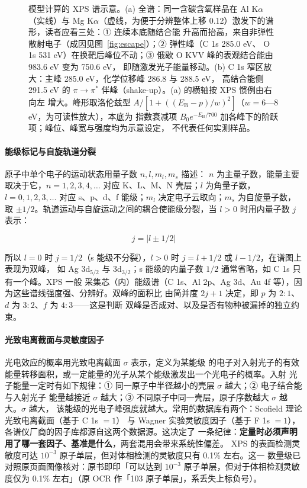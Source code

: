 \begin{figure}[tbp]
\begin{tikzpicture}
\end{tikzpicture}
\caption{模型计算的 XPS 谱示意。(a) 全谱：同一含碳含氧样品在 Al K$\alpha$（实线）与
Mg K$\alpha$（虚线，为便于分辨整体上移 0.12）激发下的谱形，读者应看三处：① 连续本底随结合能
升高而抬高，来自非弹性散射电子（成因见图~\ref{fig:escape}）；② 弹性峰（C 1s 285.0 eV、
O 1s 531 eV）在换靶后峰位不动；③ 俄歇 O KVV 峰的表观结合能由 983.6 eV 变为 750.6 eV，
即随激发光子能量移动。(b) C 1s 窄区放大：主峰 285.0 eV，化学位移峰 286.8 与 288.5 eV，
高结合能侧 291.5 eV 的 $\pi\rightarrow\pi^{*}$ 伴峰（shake-up）。(a) 的横轴按 XPS 惯例由右向左
增大。峰形取洛伦兹型 $A/[1+((E_{\mathrm{B}}-p)/w)^2]$（$w=6$—8 eV，为可读性放大），本底为
指数衰减项 $B_{0}e^{-E_{\mathrm{B}}/700}$ 加各峰下的阶跃项；峰位、峰宽与强度均为示意设定，
不代表任何实测样品。\modelmark}
\label{fig:xpsspec}
\end{figure}

\paragraph{能级标记与自旋轨道分裂}原子中单个电子的运动状态用量子数 $n,l,m_{l},m_{s}$ 描述：
$n$ 为主量子数，能量主要取决于它，$n=1,2,3,4,\dots$ 对应 K、L、M、N 壳层；$l$ 为角量子数，
$l=0,1,2,3,\dots$ 对应 s、p、d、f 能级；$m_{l}$ 决定电子云取向；$m_{s}$ 为自旋量子数，取
$\pm1/2$。轨道运动与自旋运动之间的耦合使能级分裂，当 $l>0$ 时用内量子数 $j$ 表示：

\begin{equation}\label{eq:jsplit}
j=|l\pm1/2|
\end{equation}

所以 $l=0$ 时 $j=1/2$（s 能级不分裂），$l>0$ 时 $j=l+1/2$ 或 $l-1/2$，在谱图上表现为双峰，
如 Ag 3d$_{5/2}$ 与 3d$_{3/2}$；s 能级的内量子数 $1/2$ 通常省略，如 C 1s 只有一个峰。XPS 一般
采集芯（内）能级谱（C 1s、Al 2p、Ag 3d、Au 4f 等），因为这些谱线强度强、分辨好。双峰的面积比
由简并度 $2j+1$ 决定，即 $p$ 为 $2\!:\!1$、$d$ 为 $3\!:\!2$、$f$ 为 $4\!:\!3$——这是判断
双峰是否成对、以及是否有物种被漏掉的独立约束。

\paragraph{光致电离截面与灵敏度因子}光电效应的概率用光致电离截面 $\sigma$ 表示，定义为某能级
的电子对入射光子的有效能量转移面积，或一定能量的光子从某个能级激发出一个光电子的概率。入射
光子能量一定时有如下规律：① 同一原子中半径越小的壳层 $\sigma$ 越大；② 电子结合能与入射光子
能量越接近 $\sigma$ 越大；③ 不同原子中同一壳层，原子序数越大 $\sigma$ 越大。$\sigma$ 越大，
该能级的光电子峰强度就越大。常用的数据库有两个：Scofield 理论光致电离截面（基于 C 1s $=1$）
与 Wagner 实验灵敏度因子（基于 F 1s $=1$），各谱仪厂商的因子库都源自这两个数据源。这决定了
一条纪律：\textbf{定量时必须声明用了哪一套因子、基准是什么}，两套混用会带来系统性偏差。
XPS 的表面检测灵敏度可达 $10^{-3}$ 原子单层，但对体相检测的灵敏度只有 0.1\% 左右。这一
数量级已对照原页面图像核对：原书即印「可以达到 $10^{-3}$ 原子单层，但对于体相检测灵敏度仅为
0.1\% 左右」（原 OCR 作「103 原子单层」，系丢失上标负号）。

